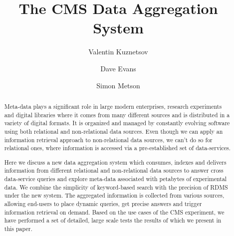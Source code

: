 \documentclass[3p,times]{elsarticle}
\begin{document}
\begin{frontmatter}




\title{The CMS Data Aggregation System}


\author[vkuznet]{Valentin Kuznetsov}
\address[vkuznet]{Cornell University, Ithaca, New York, USA}
\author[evans]{Dave Evans}
\address[evans]{Fermilab, Batavia, Illinois, USA}
\author[metson]{Simon Metson}
\address[metson]{Bristol University, Bristol, UK}


\begin{abstract}
Meta-data plays a significant role in large modern enterprises, 
research experiments and digital libraries where it comes from many different 
sources and is distributed in a variety of digital formats. 
It is organized and managed by constantly evolving software using 
both relational and non-relational data sources. Even though we can apply
an information retrieval approach to non-relational data sources,
we can't do so for relational ones, where information is accessed via
a pre-established set of data-services.

Here we discuss a new data aggregation system which consumes, 
indexes and delivers information from different relational and 
non-relational data sources to answer cross data-service queries 
and explore meta-data associated with petabytes of experimental data. 
We combine the simplicity of keyword-based search with the precision of RDMS
under the new system. The aggregated information is collected from various sources,
allowing end-users to place dynamic queries, get precise answers and 
trigger information retrieval on demand. Based on the use cases of the CMS experiment, 
we have performed a set of detailed, large scale tests the results of which 
we present in this paper.
\end{abstract}


\end{frontmatter}
\end{document}
